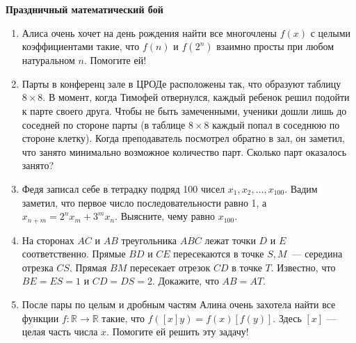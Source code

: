 \documentclass{article}
\begin{document}
\large
	

\begin{center}
\textbf{Праздничный математический бой}
\end{center}

\begin{enumerate}

\item Алиса очень хочет на день рождения найти все многочлены $f(x)$ с целыми коэффициентами такие, что $f(n)$ и $f(2^n)$ взаимно просты при любом натуральном $n$. Помогите ей!

\item Парты в конференц зале в ЦРОДе расположены так, что образуют таблицу $8 \times 8$. В момент, когда Тимофей отвернулся, каждый ребенок решил подойти к парте своего друга. Чтобы не быть замеченными, ученики дошли лишь до соседней по стороне парты (в таблице $8 \times 8$ каждый попал в соседнюю по стороне клетку). Когда преподаватель посмотрел обратно в зал, он заметил, что занято минимально возможное количество парт. Сколько парт оказалось занято?


\item Федя записал себе в тетрадку подряд 100 чисел $x_1, x_2, \dots, x_{100}$. Вадим заметил, что  первое число последовательности равно 1, а $x_{n+m} = 2^nx_m+3^mx_n$. Выясните, чему равно $x_{100}$.

\item На сторонах $AC$ и $AB$ треугольника $ABC$ лежат точки $D$ и $E$ соответственно. Прямые $BD$ и $CE$ пересекаются в точке $S, M$~--- середина отрезка $CS$. Прямая $BM$ пересекает отрезок $CD$ в точке $T$. Известно, что $BE = ES = 1$ и $CD = DS = 2$. Докажите, что $AB = AT$.

\item После пары по целым и дробным частям Алина очень захотела найти все функции $f: \mathbb{R} \rightarrow \mathbb{R}$ такие, что $f([x]y) = f(x)[f(y)]$. Здесь $[x]$ — целая часть числа $x$. Помогите ей решить эту задачу!




\end{enumerate}
\end{document}
